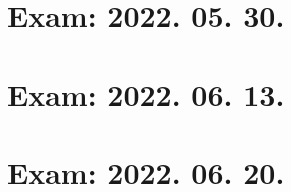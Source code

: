 \documentclass[a4paper]{article}
\begin{document}
\section{Exam: 2022. 05. 30.}
\pagebreak
\pagebreak
\pagebreak
\pagebreak
\pagebreak
\pagebreak
\pagebreak

\section{Exam: 2022. 06. 13.}
\pagebreak
\pagebreak
\pagebreak
\pagebreak
\pagebreak
\pagebreak

\section{Exam: 2022. 06. 20.}
\pagebreak
\pagebreak
\pagebreak
\pagebreak
\pagebreak
\pagebreak
\pagebreak
\end{document}
